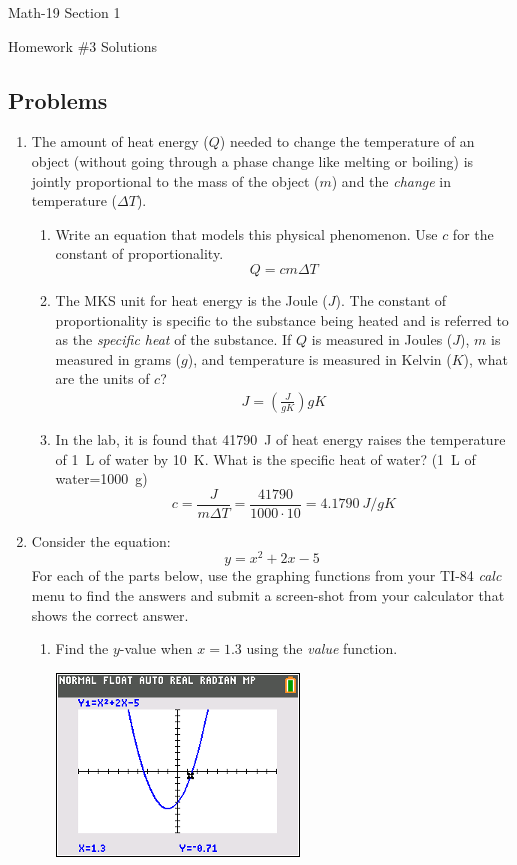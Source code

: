 \documentclass[letterpaper,12pt,fleqn]{article}
\newcommand{\dT}{\Delta T}
\begin{document}
\begin{center}
  \large
  Math-19 Section 1

  \Large
  Homework \#3 Solutions
\end{center}

\subsection*{Problems}

\begin{enumerate}
\item The amount of heat energy (\(Q\)) needed to change the temperature of an object (without going through a
  phase change like melting or boiling) is jointly proportional to the mass of the object (\(m\)) and the
  \emph{change} in temperature (\(\dT\)).
\begin{enumerate}
\item Write an equation that models this physical phenomenon. Use $c$ for the constant of proportionality.
  \[Q=cm\dT\]
\item The MKS unit for heat energy is the Joule (\(J\)). The constant of proportionality is specific to the
  substance being heated and is referred to as the \emph{specific heat} of the substance. If \(Q\) is measured in
  Joules (\(J\)), \(m\) is measured in grams (\(g\)), and temperature is measured in Kelvin (\(K\)), what are the
  units of \(c\)?
  \begin{gather*}
    J=\left(\frac{J}{gK}\right)gK
  \end{gather*}
\item In the lab, it is found that \SI{41790}{J} of heat energy raises the temperature of \SI{1}{L} of water by
  \SI{10}{K}. What is the specific heat of water?  (\SI{1}{L} of water=\SI{1000}{g})
  \[c=\frac{J}{m\dT}=\frac{41790}{1000\cdot10}=\SI{4.1790}{J/gK}\]
\end{enumerate}

\item Consider the equation:
  \[y=x^2+2x-5\]
  For each of the parts below, use the graphing functions from your TI-84 \emph{calc} menu to find the answers and
  submit a screen-shot from your calculator that shows the correct answer.
  \begin{enumerate}
  \item Find the \(y\)-value when \(x=1.3\) using the \emph{value} function.
    
    \includegraphics[scale=0.75]{hw3-2a}
    

\end{enumerate}
\end{enumerate}
\end{document}
